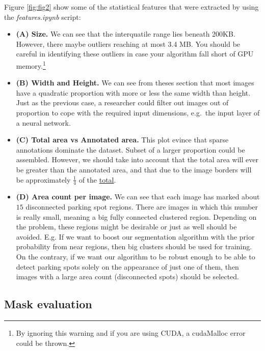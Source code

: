 \documentclass[]{article}
\providecommand{\tightlist}{%
  \setlength{\itemsep}{0pt}\setlength{\parskip}{0pt}}
\let\rmarkdownfootnote\footnote%
\def\footnote{\protect\rmarkdownfootnote}
\theoremstyle{definition}
\theoremstyle{definition}
\theoremstyle{definition}
\theoremstyle{remark}
\begin{document}
Figure \ref{fig:fig2} show some of the statistical features that were
extracted by using the \emph{features.ipynb} script:

\begin{itemize}
\tightlist
\item
  \textbf{(A) Size.} We can see that the interquatile range lies beneath
  200KB. However, there maybe outliers reaching at most 3.4 MB. You
  should be careful in identifying these outliers in case your algorithm
  fall short of GPU memory.\footnote{By ignoring this warning and if you
    are using CUDA, a cudaMalloc error could be thrown.}
\end{itemize}

\begin{itemize}
\item
  \textbf{(B) Width and Height.} We can see from theses section that
  most images have a quadratic proportion with more or less the same
  width than height. Just as the previous case, a researcher could
  filter out images out of proportion to cope with the required input
  dimensions, e.g.~the input layer of a neural network.
\item
  \textbf{(C) Total area vs Annotated area.} This plot evince that
  sparse annotations dominate the dataset. Subset of a larger proportion
  could be assembled. However, we should take into account that the
  total area will ever be greater than the annotated area, and that due
  to the image borders will be approximately \(\frac{1}{4}\) of the
  \href{http://www.eveandersson.com/pi/monte-carlo-circle}{total}.
\item
  \textbf{(D) Area count per image.} We can see that each image has
  marked about \(15\) disconnected parking spot regions. There are
  images in which this number is really small, meaning a big fully
  connected clustered region. Depending on the problem, these regions
  might be desirable or just as well should be avoided. E.g. If we want
  to boost our segmentation algorithm with the prior probability from
  near regions, then big clusters should be used for training. On the
  contrary, if we want our algorithm to be robust enough to be able to
  detect parking spots solely on the appearance of just one of them,
  then images with a large area count (disconnected spots) should be
  selected.
\end{itemize}

\hypertarget{mask-evaluation}{%
\subsection{Mask evaluation}\label{mask-evaluation}}
\end{document}

